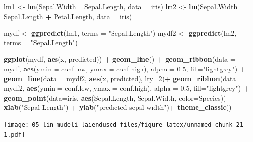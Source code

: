 \documentclass[]{book}
\newenvironment{Shaded}{\begin{snugshade}}{\end{snugshade}}
\newcommand{\DataTypeTok}[1]{\textcolor[rgb]{0.13,0.29,0.53}{#1}}
\newcommand{\DecValTok}[1]{\textcolor[rgb]{0.00,0.00,0.81}{#1}}
\newcommand{\FloatTok}[1]{\textcolor[rgb]{0.00,0.00,0.81}{#1}}
\newcommand{\KeywordTok}[1]{\textcolor[rgb]{0.13,0.29,0.53}{\textbf{#1}}}
\newcommand{\NormalTok}[1]{#1}
\newcommand{\OperatorTok}[1]{\textcolor[rgb]{0.81,0.36,0.00}{\textbf{#1}}}
\newcommand{\StringTok}[1]{\textcolor[rgb]{0.31,0.60,0.02}{#1}}
\begin{document}
\begin{Shaded}
\begin{Highlighting}[]
\NormalTok{lm1 <-}\StringTok{ }\KeywordTok{lm}\NormalTok{(Sepal.Width }\OperatorTok{~}\StringTok{ }\NormalTok{Sepal.Length, }\DataTypeTok{data =}\NormalTok{ iris)}
\NormalTok{lm2 <-}\StringTok{ }\KeywordTok{lm}\NormalTok{(Sepal.Width }\OperatorTok{~}\StringTok{ }\NormalTok{Sepal.Length }\OperatorTok{+}\StringTok{ }\NormalTok{Petal.Length, }\DataTypeTok{data =}\NormalTok{ iris)}

\NormalTok{mydf <-}\StringTok{ }\KeywordTok{ggpredict}\NormalTok{(lm1, }\DataTypeTok{terms =} \StringTok{"Sepal.Length"}\NormalTok{)}
\NormalTok{mydf2 <-}\StringTok{ }\KeywordTok{ggpredict}\NormalTok{(lm2, }\DataTypeTok{terms =} \StringTok{"Sepal.Length"}\NormalTok{)}

\KeywordTok{ggplot}\NormalTok{(mydf, }\KeywordTok{aes}\NormalTok{(x, predicted)) }\OperatorTok{+}\StringTok{ }
\StringTok{  }\KeywordTok{geom_line}\NormalTok{() }\OperatorTok{+}
\StringTok{  }\KeywordTok{geom_ribbon}\NormalTok{(}\DataTypeTok{data =}\NormalTok{ mydf, }\KeywordTok{aes}\NormalTok{(}\DataTypeTok{ymin =}\NormalTok{ conf.low, }\DataTypeTok{ymax =}\NormalTok{ conf.high), }
              \DataTypeTok{alpha =} \FloatTok{0.5}\NormalTok{, }\DataTypeTok{fill=}\StringTok{"lightgrey"}\NormalTok{) }\OperatorTok{+}
\StringTok{  }\KeywordTok{geom_line}\NormalTok{(}\DataTypeTok{data =}\NormalTok{ mydf2, }\KeywordTok{aes}\NormalTok{(x, predicted), }\DataTypeTok{lty=}\DecValTok{2}\NormalTok{)}\OperatorTok{+}
\StringTok{  }\KeywordTok{geom_ribbon}\NormalTok{(}\DataTypeTok{data =}\NormalTok{ mydf2, }\KeywordTok{aes}\NormalTok{(}\DataTypeTok{ymin =}\NormalTok{ conf.low, }\DataTypeTok{ymax =}\NormalTok{ conf.high), }
              \DataTypeTok{alpha =} \FloatTok{0.5}\NormalTok{, }\DataTypeTok{fill=}\StringTok{"lightgrey"}\NormalTok{) }\OperatorTok{+}
\StringTok{  }\KeywordTok{geom_point}\NormalTok{(}\DataTypeTok{data=}\NormalTok{iris, }\KeywordTok{aes}\NormalTok{(Sepal.Length, Sepal.Width, }\DataTypeTok{color=}\NormalTok{Species)) }\OperatorTok{+}\StringTok{ }
\StringTok{  }\KeywordTok{xlab}\NormalTok{(}\StringTok{"Sepal Length"}\NormalTok{) }\OperatorTok{+}\StringTok{ }
\StringTok{  }\KeywordTok{ylab}\NormalTok{(}\StringTok{"predicted sepal width"}\NormalTok{)}\OperatorTok{+}
\StringTok{  }\KeywordTok{theme_classic}\NormalTok{()}
\end{Highlighting}
\end{Shaded}

\texttt{[image: 05\_lin\_mudeli\_laiendused\_files/figure-latex/unnamed-chunk-21-1.pdf]}
\end{document}
